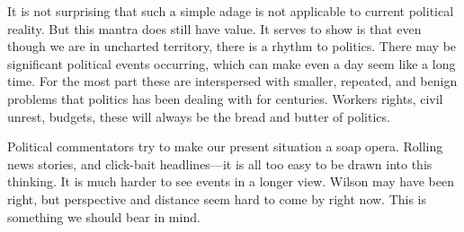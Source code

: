   It is not surprising that such a simple adage is not applicable to
   current political reality. But this mantra does still have value. It
   serves to show is that even though we are in uncharted territory, there
   is a rhythm to politics. There may be significant political events
   occurring, which can make even a day seem like a long time. For the
   most part these are interspersed with smaller, repeated, and benign
   problems that politics has been dealing with for centuries. Workers
   rights, civil unrest, budgets, these will always be the bread and
   butter of politics.

   Political commentators try to make our present situation a soap opera.
   Rolling news stories, and click-bait headlines---it is all too easy to
   be drawn into this thinking. It is much harder to see events in a
   longer view. Wilson may have been right, but perspective and distance
   seem hard to come by right now. This is something we should bear in
   mind.

